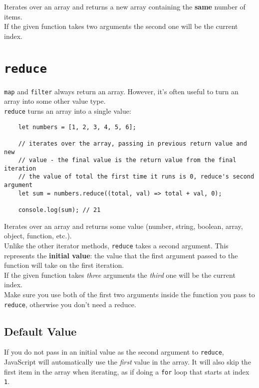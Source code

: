 Iterates over an array and returns a new array containing the \textbf{same} number of items.
\\

If the given function takes two arguments the second one will be the current index.



\section{\texttt{reduce}}

\texttt{map} and \texttt{filter} always return an array. However, it's often useful to turn an array into some other value type.
\\

\texttt{reduce} turns an array into a single value:

\begin{verbatim}
    let numbers = [1, 2, 3, 4, 5, 6];

    // iterates over the array, passing in previous return value and new
    // value - the final value is the return value from the final iteration
    // the value of total the first time it runs is 0, reduce's second argument
    let sum = numbers.reduce((total, val) => total + val, 0);

    console.log(sum); // 21
\end{verbatim}

Iterates over an array and returns some value (number, string, boolean, array, object, function, etc.).
\\

Unlike the other iterator methods, \texttt{reduce} takes a second argument. This represents the \textbf{initial value}: the value that the first argument passed to the function will take on the first iteration.
\\

If the given function takes \textit{three} arguments the \textit{third} one will be the current index.
\\

Make sure you use both of the first two arguments inside the function you pass to \texttt{reduce}, otherwise you don't need a reduce.

\subsection{Default Value}

If you do not pass in an initial value as the second argument to \texttt{reduce}, JavaScript will automatically use the \textit{first} value in the array. It will also skip the first item in the array when iterating, as if doing a \texttt{for} loop that starts at index \texttt{1}.
\\

